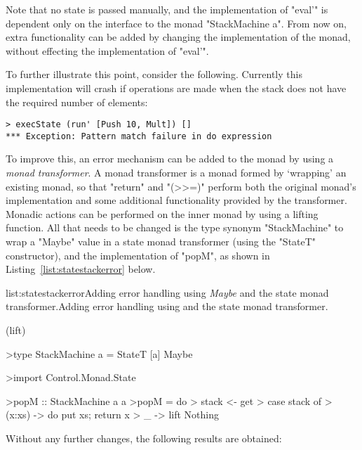 Note that no state is passed manually, and the implementation of "eval'" is dependent only on the interface to the monad "StackMachine a". From now on, extra functionality can be added by changing the implementation of the monad, without effecting the implementation of "eval'". 

To further illustrate this point, consider the following. Currently this implementation will crash if operations are made when the stack does not have the required number of elements:

\begin{verbatim}
> execState (run' [Push 10, Mult]) []
*** Exception: Pattern match failure in do expression
\end{verbatim}

\noindent To improve this, an error mechanism can be added to the monad by using a \emph{monad transformer}. A monad transformer is a monad formed by `wrapping' an existing monad, so that "return" and "(>>=)" perform both the original monad's implementation and some additional functionality provided by the transformer. Monadic actions can be performed on the inner monad by using a lifting function. All that needs to be changed is the type synonym "StackMachine" to wrap a "Maybe" value in a state monad transformer (using the "StateT" constructor), and the implementation of "popM", as shown in Listing~\ref{list:statestackerror} below.

\vspace{-0.5em}
\begin{listing}{list:statestackerror}{Adding error handling using \emph{Maybe} and the state monad transformer.}{Adding error handling using  and the state monad transformer.}{}
\end{listing}\vspace{-1.5em}

\functions(lift)
\begin{haskell}

>type StackMachine a = StateT [a] Maybe

>import Control.Monad.State

>popM :: StackMachine a a
>popM = do
>  stack <- get
>  case stack of
>    (x:xs) -> do put xs; return x
>    _ -> lift Nothing


\end{haskell}
\noindent Without any further changes, the following results are obtained:

